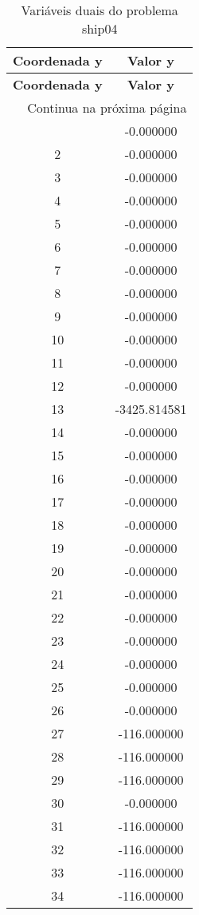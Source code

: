 \documentclass[12pt]{article}
\begin{document}
\begin{longtable}{@{}cc@{}}
\caption{Variáveis duais do problema ship04} \\
\toprule
\textbf{Coordenada y} & \textbf{Valor y} \\
\midrule
\endfirsthead

\toprule
\textbf{Coordenada y} & \textbf{Valor y} \\
\midrule
\endhead

\midrule \multicolumn{2}{r}{{Continua na próxima página}} \\ \midrule
\endfoot

\bottomrule
\endlastfoot
1 & -0.000000 \\
2 & -0.000000 \\
3 & -0.000000 \\
4 & -0.000000 \\
5 & -0.000000 \\
6 & -0.000000 \\
7 & -0.000000 \\
8 & -0.000000 \\
9 & -0.000000 \\
10 & -0.000000 \\
11 & -0.000000 \\
12 & -0.000000 \\
13 & -3425.814581 \\
14 & -0.000000 \\
15 & -0.000000 \\
16 & -0.000000 \\
17 & -0.000000 \\
18 & -0.000000 \\
19 & -0.000000 \\
20 & -0.000000 \\
21 & -0.000000 \\
22 & -0.000000 \\
23 & -0.000000 \\
24 & -0.000000 \\
25 & -0.000000 \\
26 & -0.000000 \\
27 & -116.000000 \\
28 & -116.000000 \\
29 & -116.000000 \\
30 & -0.000000 \\
31 & -116.000000 \\
32 & -116.000000 \\
33 & -116.000000 \\
34 & -116.000000 \\

\end{longtable}
\end{document}
